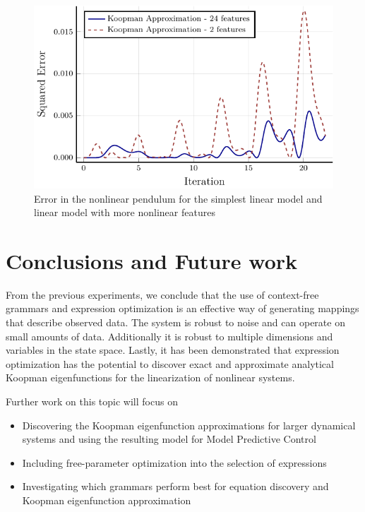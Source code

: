 \documentclass{article}
\begin{document}
\begin{figure}
\vskip 0.2in
\begin{center}
\centerline{\includegraphics[width=\columnwidth]{./figures/pendulum}}
\caption{Error in the nonlinear pendulum for the simplest linear model and linear model with more nonlinear features}
\label{fig:pendulum}
\end{center}
\vskip -0.2in
\end{figure}

\section{Conclusions and Future work}
\label{conclusion}

From the previous experiments, we conclude that the use of context-free grammars and expression optimization is an effective way of generating mappings that describe observed data. The system is robust to noise and can operate on small amounts of data. Additionally it is robust to multiple dimensions and variables in the state space. Lastly, it has been demonstrated that expression optimization has the potential to discover exact and approximate analytical Koopman eigenfunctions for the linearization of nonlinear systems. 

Further work on this topic will focus on
\begin{itemize}
\item Discovering the Koopman eigenfunction approximations for larger dynamical systems and using the resulting model for Model Predictive Control
\item Including free-parameter optimization into the selection of expressions
\item Investigating which grammars perform best for equation discovery and Koopman eigenfunction approximation
\end{itemize}







\end{document}
